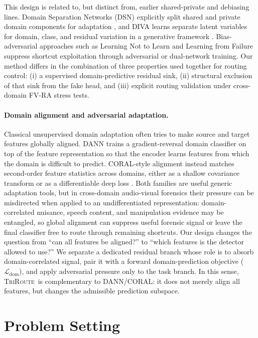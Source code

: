 \documentclass{article}
\newcommand{\method}{\textsc{TriRoute}}
\begin{document}
This design is related to, but distinct from, earlier shared-private and debiasing lines. Domain Separation Networks (DSN) explicitly split shared and private domain components for adaptation \citep{bousmalis2016dsn}, and DIVA learns separate latent variables for domain, class, and residual variation in a generative framework \citep{ilse2019diva}. Bias-adversarial approaches such as Learning Not to Learn \citep{kim2019learningnottolearn} and Learning from Failure \citep{nam2020learningfromfailure} suppress shortcut exploitation through adversarial or dual-network training. Our method differs in the combination of three properties used together for routing control: (i) a supervised domain-predictive residual sink, (ii) structural exclusion of that sink from the fake head, and (iii) explicit routing validation under cross-domain FV-RA stress tests.

\paragraph{Domain alignment and adversarial adaptation.}
Classical unsupervised domain adaptation often tries to make source and target features globally aligned. DANN \citep{ganin2016dann} trains a gradient-reversal domain classifier on top of the feature representation so that the encoder learns features from which the domain is difficult to predict. CORAL-style alignment instead matches second-order feature statistics across domains, either as a shallow covariance transform or as a differentiable deep loss \citep{sun2016deepcoral}. Both families are useful generic adaptation tools, but in cross-domain audio-visual forensics their pressure can be misdirected when applied to an undifferentiated representation: domain-correlated nuisance, speech content, and manipulation evidence may be entangled, so global alignment can suppress useful forensic signal or leave the final classifier free to route through remaining shortcuts. Our design changes the question from ``can all features be aligned?'' to ``which features is the detector allowed to use?'' We separate a dedicated residual branch whose role is to absorb domain-correlated signal, pair it with a forward domain-prediction objective ($\mathcal{L}_{\mathrm{dom}}$), and apply adversarial pressure only to the task branch. In this sense, \method\ is complementary to DANN/CORAL: it does not merely align all features, but changes the admissible prediction subspace.

\section{Problem Setting}
\end{document}
